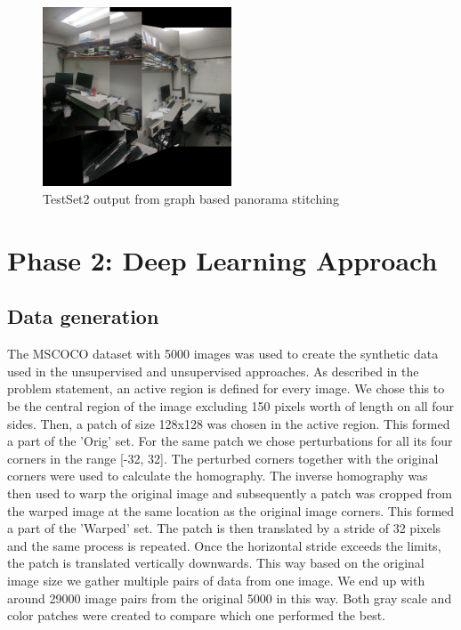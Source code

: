 \documentclass[conference]{IEEEtran}
\begin{document}
\begin{figure}[!h]
  \centering
  \captionsetup{justification=centering}
  \includegraphics[width=0.5\textwidth]{phase1/graphset_image312456789_clear_stitch9.png}
  \caption{\label{fig:graph_testset2}TestSet2 output from graph based panorama stitching}
\end{figure}


\section{Phase 2: Deep Learning Approach}


\subsection{Data generation}

The MSCOCO dataset with 5000 images was used to create the synthetic data used in the unsupervised and unsupervised approaches. As described in the problem statement, an active region is defined for every image. We chose this to be the central region of the image excluding 150 pixels worth of length on all four sides. Then, a patch of size 128x128 was chosen in the active region. This formed a part of the 'Orig' set. For the same patch we chose perturbations for all its four corners in the range [-32, 32]. The perturbed corners together with the original corners were used to calculate the homography. The inverse homography was then used to warp the original image and subsequently a patch was cropped from the warped image at the same location as the original image corners. This formed a part of the 'Warped' set. The patch is then translated by a stride of 32 pixels and the same process is repeated. Once the horizontal stride exceeds the limits, the patch is translated vertically downwards. This way based on the original image size we gather multiple pairs of data from one image. We end up with around 29000 image pairs from the original 5000 in this way. Both gray scale and color patches were created to compare which one performed the best.
\end{document}
